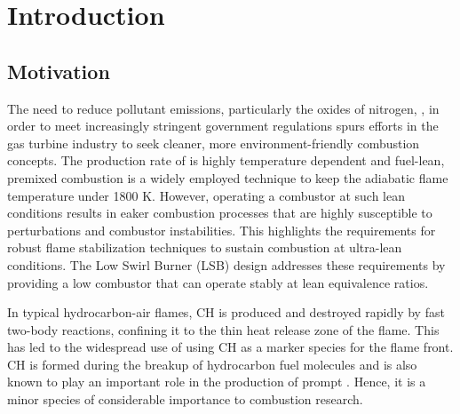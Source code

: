 \chapter{Introduction}
\label{ch:introduction}






\section{Motivation}

The need to reduce pollutant emissions, particularly the oxides of nitrogen, , in order to meet increasingly stringent government regulations spurs efforts in the gas turbine industry to seek cleaner, more environment-friendly combustion concepts.
The production rate of  is highly temperature dependent and fuel-lean, premixed combustion is a widely employed technique to keep the adiabatic flame temperature under 1800 K.
However, operating a combustor at such lean conditions results in eaker combustion processes that are highly susceptible to perturbations and combustor instabilities.
This highlights the requirements for robust flame stabilization techniques to sustain combustion at ultra-lean conditions.
The Low Swirl Burner (LSB) design addresses these requirements by providing a low  combustor that can operate stably at lean equivalence ratios.

In typical hydrocarbon-air flames, CH is produced and destroyed rapidly by fast two-body reactions, confining it to the thin heat release zone of the flame.
This has led to the widespread use of using CH as a marker species for the flame front.\cite{2005-vagelopoulos}
CH is formed during the breakup of hydrocarbon fuel molecules\cite{2010-kohler} and is also known to play an important role in the production of prompt .\cite{1971-fenimore}
Hence, it is a minor species of considerable importance to combustion research.

